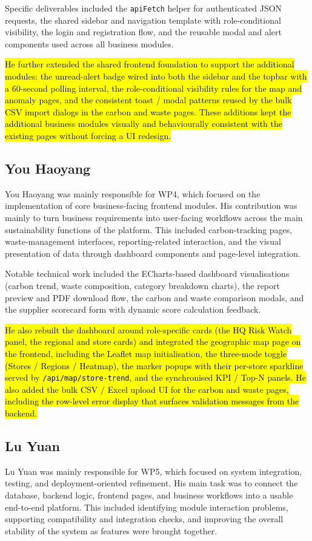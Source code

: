 \documentclass[11pt,a4paper]{article}
\newcommand{\new}[1]{\hl{#1}}
\begin{document}
Specific deliverables included the \texttt{apiFetch} helper for authenticated JSON requests, the shared sidebar and navigation template with role-conditional visibility, the login and registration flow, and the reusable modal and alert components used across all business modules.

\new{He further extended the shared frontend foundation to support the additional modules: the unread-alert badge wired into both the sidebar and the topbar with a 60-second polling interval, the role-conditional visibility rules for the map and anomaly pages, and the consistent toast / modal patterns reused by the bulk CSV import dialogs in the carbon and waste pages. These additions kept the additional business modules visually and behaviourally consistent with the existing pages without forcing a UI redesign.}

\subsection{You Haoyang}
You Haoyang was mainly responsible for WP4, which focused on the implementation of core business-facing frontend modules. His contribution was mainly to turn business requirements into user-facing workflows across the main sustainability functions of the platform. This included carbon-tracking pages, waste-management interfaces, reporting-related interaction, and the visual presentation of data through dashboard components and page-level integration.

Notable technical work included the ECharts-based dashboard visualisations (carbon trend, waste composition, category breakdown charts), the report preview and PDF download flow, the carbon and waste comparison modals, and the supplier scorecard form with dynamic score calculation feedback.

\new{He also rebuilt the dashboard around role-specific cards (the HQ Risk Watch panel, the regional and store cards) and integrated the geographic map page on the frontend, including the Leaflet map initialisation, the three-mode toggle (Stores / Regions / Heatmap), the marker popups with their per-store sparkline served by \texttt{/api/map/store-trend}, and the synchronised KPI / Top-N panels. He also added the bulk CSV / Excel upload UI for the carbon and waste pages, including the row-level error display that surfaces validation messages from the backend.}

\subsection{Lu Yuan}
Lu Yuan was mainly responsible for WP5, which focused on system integration, testing, and deployment-oriented refinement. His main task was to connect the database, backend logic, frontend pages, and business workflows into a usable end-to-end platform. This included identifying module interaction problems, supporting compatibility and integration checks, and improving the overall stability of the system as features were brought together.
\end{document}
